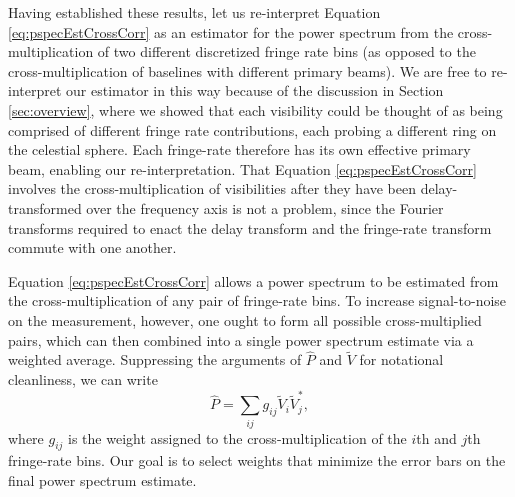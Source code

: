\documentclass[twocolumn,apj,numberedappendix]{emulateapj}
\begin{document}
Having established these results, let us re-interpret Equation \eqref{eq:pspecEstCrossCorr} as an estimator for the power spectrum from the cross-multiplication of two different discretized fringe rate bins (as opposed to the cross-multiplication of baselines with different primary beams). We are free to re-interpret our estimator in this way because of the discussion in Section \ref{sec:overview}, where we showed that each visibility could be thought of as being comprised of different fringe rate contributions, each probing a different ring on the celestial sphere. Each fringe-rate therefore has its own effective primary beam, enabling our re-interpretation. That Equation \eqref{eq:pspecEstCrossCorr} involves the cross-multiplication of visibilities after they have been delay-transformed over the frequency axis is not a problem, since the Fourier transforms required to enact the delay transform and the fringe-rate transform commute with one another.

Equation \eqref{eq:pspecEstCrossCorr} allows a power spectrum to be estimated from the cross-multiplication of any pair of fringe-rate bins. To increase signal-to-noise on the measurement, however, one ought to form all possible cross-multiplied pairs, which can then combined into a single power spectrum estimate via a weighted average. Suppressing the arguments of $\widehat{P}$ and $\widetilde{V}$ for notational cleanliness, we can write
\begin{equation}
\label{eq:wVV}
\widehat{P} = \sum_{ij} g_{ij} \widetilde{V}_i \widetilde{V}_j^*,
\end{equation}
where $g_{ij}$ is the weight assigned to the cross-multiplication of the $i$th and $j$th fringe-rate bins. Our goal is to select weights that minimize the error bars on the final power spectrum estimate. 
\end{document}
